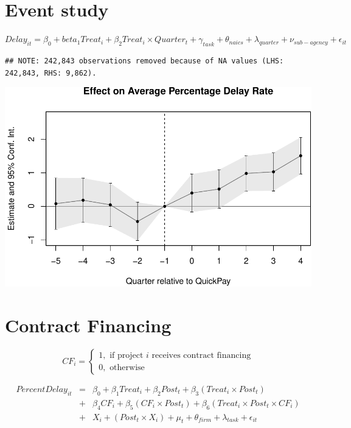\documentclass[
]{article}
\begin{document}
\hypertarget{event-study}{%
\section{Event study}\label{event-study}}

\(Delay_{it}=\beta_0 + beta_1 Treat_i + \beta_2 Treat_i \times Quarter_t + \gamma_{task} + \theta_{naics}+\lambda_{quarter}+\nu_{sub-agency}+\epsilon_{it}\)

\begin{verbatim}
## NOTE: 242,843 observations removed because of NA values (LHS: 242,843, RHS: 9,862).
\end{verbatim}

\includegraphics{qp_first_pc_delay-2_files/figure-latex/event_study-1.pdf}

\hypertarget{contract-financing}{%
\section{Contract Financing}\label{contract-financing}}

\[ CF_i = \begin{cases} 1, \text{ if project } i \text{ receives contract financing}\\
0, \text{ otherwise} \end{cases}\]

\[ \begin{aligned}
PercentDelay_{it} &=& \beta_0+\beta_1 Treat_i + \beta_2 Post_t + \beta_3 (Treat_i \times Post_t) \\
&+&\beta_4 CF_i + \beta_5 (CF_i \times Post_t) + \beta_6 (Treat_i \times Post_t \times CF_i) \\ 
&+&X_i + (Post_t \times X_i) + \mu_t + \theta_{firm} + \lambda_{task}+ \epsilon_{it}
\end{aligned}\]
\end{document}
